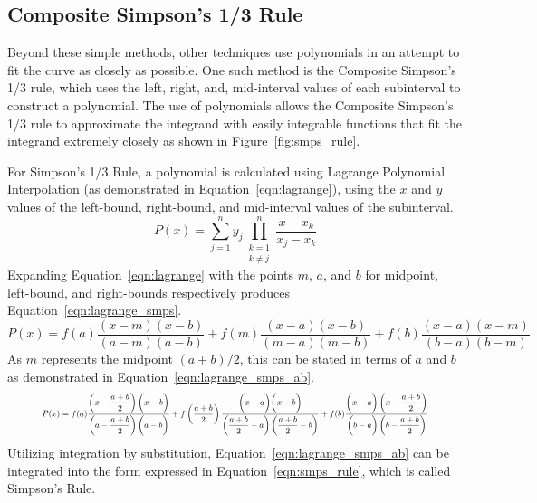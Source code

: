 \documentclass{paper}
\begin{document}
\subsection{Composite Simpson's 1/3 Rule}
Beyond these simple methods, other techniques use polynomials in an attempt to fit the curve as closely as possible.
One such method is the Composite Simpson's 1/3 rule, which uses the left, right, and, mid-interval values of each subinterval to construct a polynomial.
The use of polynomials allows the Composite Simpson's 1/3 rule to approximate the integrand with easily integrable functions that fit the integrand extremely closely as shown in Figure~\ref{fig:smps_rule}.
%

%
For Simpson's 1/3 Rule, a polynomial is calculated using Lagrange Polynomial Interpolation (as demonstrated in Equation~\ref{eqn:lagrange}), using the \(x\) and \(y\) values of the left-bound, right-bound, and mid-interval values of the subinterval.
%
\begin{equation}
    \label{eqn:lagrange}
    P(x) = \sum_{j=1}^n y_j \prod_{\substack{k = 1 \\ k \neq j}}^n \dfrac{x - x_k}{x_j - x_k}
\end{equation}
%
Expanding Equation~\ref{eqn:lagrange} with the points \(m\), \(a\), and \(b\) for midpoint, left-bound, and right-bounds respectively produces Equation~\ref{eqn:lagrange_smps}.
%
\begin{equation}
    \label{eqn:lagrange_smps}
    P(x) = f(a) \dfrac{(x - m)(x - b)}{(a - m)(a - b)} + f(m) \dfrac{(x - a)(x - b)}{(m - a)(m - b)} + f(b) \dfrac{(x - a)(x - m)}{(b - a)(b - m)}
\end{equation}
%
As \(m\) represents the midpoint \((a + b) / 2\), this can be stated in terms of \(a\) and \(b\) as demonstrated in Equation~\ref{eqn:lagrange_smps_ab}.
%
\begin{equation}
    \label{eqn:lagrange_smps_ab}
    \resizebox{.9\textwidth}{!} 
    {
    $P(x) = f(a) \dfrac{\left(x - \dfrac{a+b}{2}\right)\biggl(x - b\biggr)}{\left(a - \dfrac{a+b}{2}\right)\biggl(a - b\biggr)} + f\left(\dfrac{a+b}{2}\right) \dfrac{\biggl(x - a\biggr)\biggl(x - b\biggr)}{\left(\dfrac{a+b}{2} - a\right)\left(\dfrac{a+b}{2} - b\right)} + f(b) \dfrac{\biggl(x - a\biggr)\left(x - \dfrac{a+b}{2}\right)}{\biggl(b - a\biggr)\left(b - \dfrac{a+b}{2}\right)}$
    }
\end{equation}
%
Utilizing integration by substitution, Equation~\ref{eqn:lagrange_smps_ab} can be integrated into the form expressed in Equation~\ref{eqn:smps_rule}, which is called Simpson's Rule.
\end{document}
